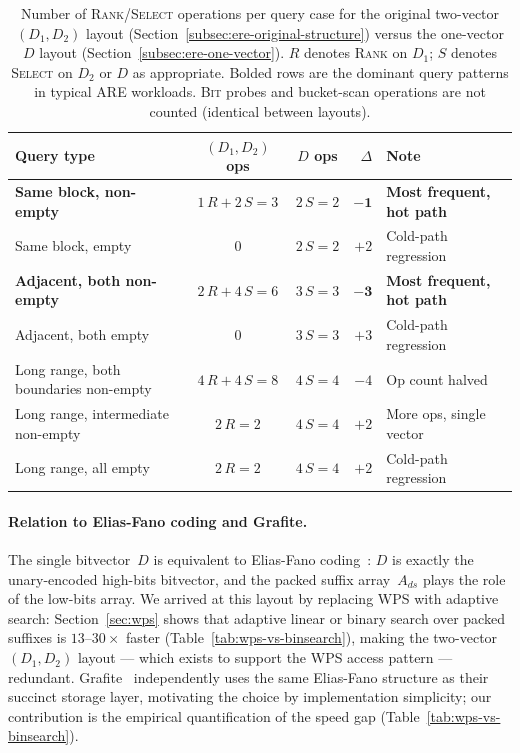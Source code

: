 \begin{table}[H]
    \centering
    \begin{tabular}{@{}lccrl@{}}
        \toprule
        Query type                            & $(D_1, D_2)$ ops  & $D$ ops    & $\Delta$      & Note                             \\
        \midrule
        \textbf{Same block, non-empty}        & $1\,R + 2\,S = 3$ & $2\,S = 2$ & $\mathbf{-1}$ & \textbf{Most frequent, hot path} \\
        Same block, empty                     & $0$               & $2\,S = 2$ & $+2$          & Cold-path regression             \\
        \textbf{Adjacent, both non-empty}     & $2\,R + 4\,S = 6$ & $3\,S = 3$ & $\mathbf{-3}$ & \textbf{Most frequent, hot path} \\
        Adjacent, both empty                  & $0$               & $3\,S = 3$ & $+3$          & Cold-path regression             \\
        Long range, both boundaries non-empty & $4\,R + 4\,S = 8$ & $4\,S = 4$ & $-4$          & Op count halved                  \\
        Long range, intermediate non-empty    & $2\,R = 2$        & $4\,S = 4$ & $+2$          & More ops, single vector          \\
        Long range, all empty                 & $2\,R = 2$        & $4\,S = 4$ & $+2$          & Cold-path regression             \\
        \bottomrule
    \end{tabular}
    \caption{Number of \textsc{Rank}/\textsc{Select} operations per query case for the
    original two-vector $(D_1, D_2)$ layout (Section~\ref{subsec:ere-original-structure})
        versus the one-vector $D$ layout (Section~\ref{subsec:ere-one-vector}).
        $R$ denotes \textsc{Rank} on $D_1$; $S$ denotes \textsc{Select} on $D_2$ or $D$ as
        appropriate. Bolded rows are the dominant query patterns in typical ARE workloads.
        \textsc{Bit} probes and bucket-scan operations are not counted (identical between
        layouts).}
    \label{tab:ere-rank-select}
\end{table}

\paragraph{Relation to Elias-Fano coding and Grafite.}
The single bitvector~$D$ is equivalent to Elias-Fano
coding~\citep{elias1974efficient,fano1971number}: $D$ is exactly the unary-encoded
high-bits bitvector, and the packed suffix array~$A_{ds}$ plays the role of the
low-bits array.
We arrived at this layout by replacing WPS with adaptive search:
Section~\ref{sec:wps} shows that adaptive linear or binary
search over packed suffixes is $13$--$30\times$ faster (Table~\ref{tab:wps-vs-binsearch}),
making the two-vector $(D_1, D_2)$ layout --- which exists to support the WPS access
pattern --- redundant.
Grafite~\citep{grafite2024} independently uses the same Elias-Fano structure as their
succinct storage layer, motivating the choice by implementation simplicity; our
contribution is the empirical quantification of the speed gap
(Table~\ref{tab:wps-vs-binsearch}).

